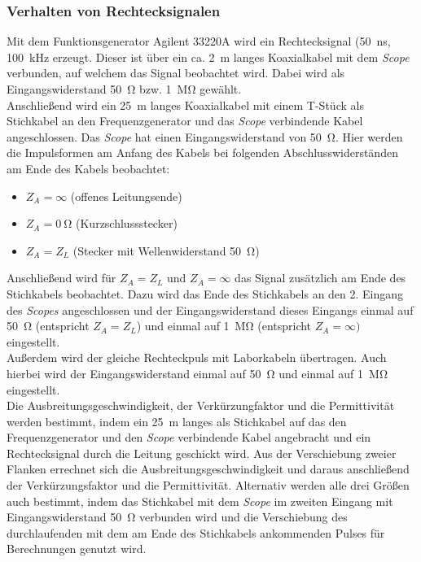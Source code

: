 \documentclass[a4paper,twoside,final]{article}
\begin{document}
\subsubsection{Verhalten von Rechtecksignalen}
Mit dem Funktionsgenerator Agilent 33220A wird ein Rechtecksignal (\SI{50}{\nano\second}, \SI{100}{\kilo\hertz} erzeugt. Dieser ist über ein ca. \SI{2}{\metre} langes Koaxialkabel mit dem \textit{Scope} verbunden, auf welchem das Signal beobachtet wird. Dabei wird als Eingangswiderstand \SI{50}{\ohm} bzw. \SI{1}{\mega\ohm} gewählt.\\
Anschließend wird ein \SI{25}{\metre} langes Koaxialkabel mit einem T-Stück als Stichkabel an den Frequenzgenerator und das \textit{Scope} verbindende Kabel angeschlossen. Das \textit{Scope} hat einen Eingangswiderstand von \SI{50}{\ohm}. Hier werden die Impulsformen am Anfang des Kabels bei folgenden Abschlusswiderständen am Ende des Kabels beobachtet:
\begin{itemize}
  \item $Z_A = \infty$ (offenes Leitungsende)
  \item $Z_A = \SI{0}{\ohm}$ (Kurzschlussstecker)
  \item $Z_A = Z_L$ (Stecker mit Wellenwiderstand \SI{50}{\ohm})
\end{itemize}
Anschließend wird für $Z_A=Z_L$ und $Z_A = \infty$ das Signal zusätzlich am Ende des Stichkabels beobachtet. Dazu wird das Ende des Stichkabels an den 2. Eingang des \textit{Scopes} angeschlossen und der Eingangswiderstand dieses Eingangs einmal auf \SI{50}{\ohm} (entspricht $Z_A = Z_L$) und einmal auf \SI{1}{\mega\ohm} (entspricht $Z_A = \infty)$ eingestellt. \\

Außerdem wird der gleiche Rechteckpuls mit Laborkabeln übertragen. Auch hierbei wird der Eingangswiderstand einmal auf \SI{50}{\ohm} und einmal auf \SI{1}{\mega\ohm} eingestellt. \\

Die Ausbreitungsgeschwindigkeit, der Verkürzungfaktor und die Permittivität werden bestimmt, indem ein \SI{25}{\metre} langes als Stichkabel auf das den Frequenzgenerator und den \textit{Scope} verbindende Kabel angebracht und ein Rechtecksignal durch die Leitung geschickt wird. Aus der Verschiebung zweier Flanken errechnet sich die Ausbreitungsgeschwindigkeit und daraus anschließend der Verkürzungsfaktor und die Permittivität. Alternativ werden alle drei Größen auch bestimmt, indem das Stichkabel mit dem \textit{Scope} im zweiten Eingang mit Eingangswiderstand \SI{50}{\ohm} verbunden wird und die Verschiebung des durchlaufenden mit dem am Ende des Stichkabels ankommenden Pulses für Berechnungen genutzt wird.
\end{document}
